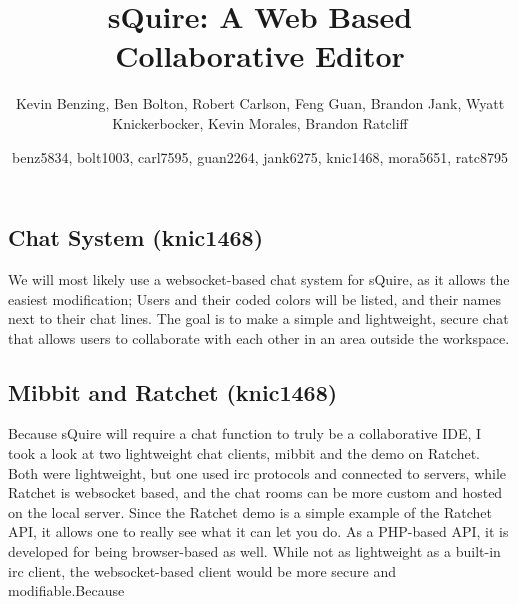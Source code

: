 \documentclass[11pt]{report}
\title{sQuire: A Web Based Collaborative Editor}
\author{Kevin Benzing, Ben Bolton, Robert Carlson, Feng Guan, Brandon Jank, Wyatt Knickerbocker, Kevin Morales, Brandon Ratcliff}
\author{benz5834, bolt1003, carl7595, guan2264, jank6275, knic1468, mora5651, ratc8795}
\begin{document}
\maketitle

\subsection{Chat System (knic1468)}
We will most likely use a websocket-based chat system for sQuire, as it allows the easiest modification; Users and their coded colors will be listed, and their names next to their chat lines. The goal is to make a simple and lightweight, secure chat that allows users to collaborate with each other in an area outside the workspace.

\subsection{Mibbit and Ratchet (knic1468)}
Because sQuire will require a chat function to truly be a collaborative IDE, I took a look at two lightweight chat clients, mibbit and the demo on Ratchet. Both were lightweight, but one used irc protocols and connected to servers, while Ratchet is websocket based, and the chat rooms can be more custom and hosted on the local server. Since the Ratchet demo is a simple example of the Ratchet API, it allows one to really see what it can let you do. As a PHP-based API, it is developed for being browser-based as well. While not as lightweight as a built-in irc client, the websocket-based client would be more secure and modifiable.Because
\end{document}
